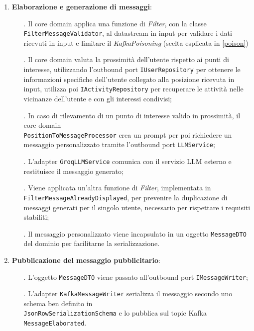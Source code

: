\documentclass[10pt]{article}
\begin{document}
\begin{enumerate}
        \item \textbf{Elaborazione e generazione di messaggi}:
        \begin{itemize}
            \item[.] Il core domain applica una funzione di \textit{Filter}, con la classe \texttt{FilterMessageValidator}, al datastream in input per validare i dati ricevuti in input e limitare il \textit{KafkaPoisoning} (scelta esplicata in \ref{poison})
            \item[.] Il core domain valuta la prossimità dell'utente rispetto ai punti di interesse, utilizzando l'outbound port \texttt{IUserRepository} per ottenere le informazioni specifiche dell'utente collegato alla posizione ricevuta in input, utilizza poi \texttt{IActivityRepository} per recuperare le attività nelle vicinanze dell'utente e con gli interessi condivisi;
            \item[.] In caso di rilevamento di un punto di interesse valido in prossimità, il core domain \\\texttt{PositionToMessageProcessor} crea un prompt per poi richiedere un messaggio personalizzato tramite l'outbound port \texttt{LLMService};
            \item[.] L'adapter \texttt{GroqLLMService} comunica con il servizio LLM esterno e restituisce il messaggio generato;
            \item[.] Viene applicata un'altra funzione di \textit{Filter}, implementata in \texttt{FilterMessageAlreadyDisplayed}, per prevenire la duplicazione di messaggi generati per il singolo utente, necessario per rispettare i requisiti stabiliti;
            \item[.] Il messaggio personalizzato viene incapsulato in un oggetto \texttt{MessageDTO} del dominio per facilitarne la serializzazione.
        \end{itemize}

        \item \textbf{Pubblicazione del messaggio pubblicitario}:
        \begin{itemize}
            \item[.] L'oggetto \texttt{MessageDTO} viene passato all'outbound port \texttt{IMessageWriter};
            \item[.] L'adapter \texttt{KafkaMessageWriter} serializza il messaggio secondo uno schema ben definito in \\ \texttt{JsonRowSerializationSchema} e lo pubblica sul topic Kafka \texttt{MessageElaborated}.
        \end{itemize}


\end{enumerate}
\end{document}
